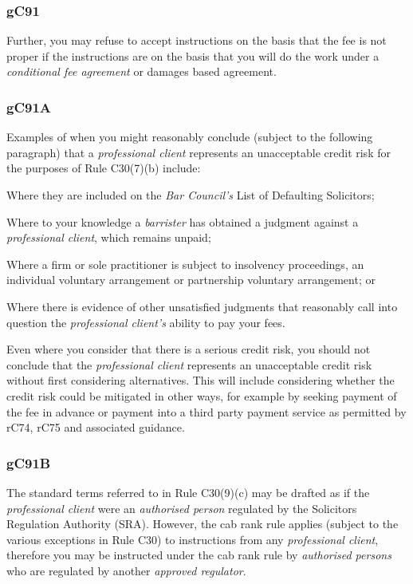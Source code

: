 \subsubsection{\color{darkgrey}gC91}

Further, you may refuse to accept instructions on the basis that the fee
is not proper if the instructions are on the basis that you will do the
work under a \emph{conditional fee agreement} or damages based
agreement.

\subsubsection{\color{darkgrey}gC91A}

Examples of when you might reasonably conclude (subject to the following
paragraph) that a \emph{professional client} represents an unacceptable
credit risk for the purposes of Rule C30(7)(b) include:
\begin{numlist}\item Where they are included on the \emph{Bar Council's} List of
Defaulting Solicitors;
\item Where to your knowledge a \emph{barrister} has obtained a judgment
against a \emph{professional client}, which remains unpaid;
\item Where a firm or sole practitioner is subject to insolvency
proceedings, an individual voluntary arrangement or partnership
voluntary arrangement; or
\item Where there is evidence of other unsatisfied judgments that
reasonably call into question the \emph{professional client's} ability
to pay your fees.\end{numlist}


Even where you consider that there is a serious credit risk, you should
not conclude that the \emph{professional client} represents an
unacceptable credit risk without first considering alternatives. This
will include considering whether the credit risk could be mitigated in
other ways, for example by seeking payment of the fee in advance or
payment into a third party payment service as permitted by rC74, rC75
and associated guidance.

\subsubsection{\color{darkgrey}gC91B}

The standard terms referred to in Rule C30(9)(c) may be drafted as if the
\emph{professional client} were an \emph{authorised person} regulated by
the Solicitors Regulation Authority (SRA). However, the cab rank rule
applies (subject to the various exceptions in Rule C30) to instructions
from any \emph{professional client}, therefore you may be instructed
under the cab rank rule by \emph{authorised persons} who are regulated
by another \emph{approved regulator}.

